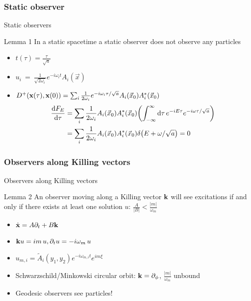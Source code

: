 \documentclass{beamer}
\renewcommand{\va}[1]{\vec{#1}}
\begin{document}
\subsubsection{Static observer}
\begin{frame}{Static observers}
\begin{block}{Lemma 1}
In a static spacetime a static observer does not observe any particles
\end{block}
\begin{itemize}
	\item \(t(\tau) = \frac{\tau}{\sqrt{a}}\)
	\item \(u_i~=~\frac{1}{\sqrt{2\omega_i}}e^{-i\omega_i t} A_i(\va{x})\)
	\item \(D^+(\vb{x}(\tau), \vb{x}(0)) = \sum_i \frac{1}{2\omega_i} e^{-i\omega_i\tau/\sqrt{a}} A_i(\va{x}_0)A_i^*(\va{x}_0)\)
	\begin{align*}
	\dv{F_E}{\tau} &= \sum_i \frac{1}{2\omega_i} A_i(\va{x}_0)A_i^*(\va{x}_0) \qty(\int_{-\infty}^\infty \dd{\tau} e^{-i E \tau} e^{-i\omega  \tau/\sqrt{a}})\\
	 	&= \sum_i \frac{1}{2\omega_i} A_i(\va{x}_0)A_i^*(\va{x}_0) \delta\qty(E + \omega/\sqrt{a}) = 0
	\end{align*}
\end{itemize}
\end{frame}

\subsubsection{Observers along Killing vectors}
\begin{frame}{Observers along Killing vectors}
\begin{block}{Lemma 2}
An observer moving along a Killing vector \(\vb{k}\) will see excitations if and only if there exists at least one solution \(u\): \(\frac{A}{|B|} < \frac{|m|}{\omega_m}\)
\begin{itemize}
	\item \(\dot{\vb{x}} = A\partial_t + B\vb{k}\)
	\item \(\vb{k} u = i m\,u, \partial_t u = - i \omega_m\,u\)
\end{itemize}
\end{block} 
\begin{itemize}
	\item \(u_{m, i} = \tilde{A}_i(y_1, y_2) e^{-i\omega_{m,i} t} e^{i m \xi}\)
	\item Schwarzschild/Minkowski circular orbit: \(\vb{k} = \partial_\phi\), \(\frac{|m|}{\omega_m}\) unbound
	\item Geodesic observers see particles!
\end{itemize}
\end{frame}
\end{document}

